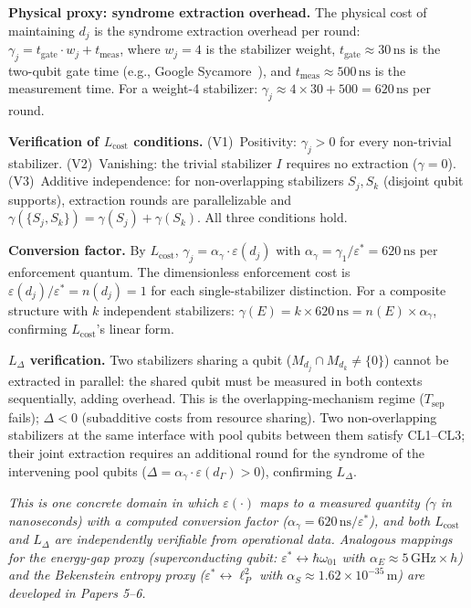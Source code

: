 \documentclass[11pt]{article}
\theoremstyle{remark}
\begin{document}
\smallskip\noindent\textbf{Physical proxy: syndrome extraction overhead.}  The physical cost of maintaining $d_j$ is the syndrome extraction overhead per round: $\gamma_j = t_{\mathrm{gate}} \cdot w_j + t_{\mathrm{meas}}$, where $w_j = 4$ is the stabilizer weight, $t_{\mathrm{gate}} \approx 30\,\mathrm{ns}$ is the two-qubit gate time (e.g., Google Sycamore~\cite{GoogleQEC2023}), and $t_{\mathrm{meas}} \approx 500\,\mathrm{ns}$ is the measurement time.  For a weight-4 stabilizer: $\gamma_j \approx 4 \times 30 + 500 = 620\,\mathrm{ns}$ per round.

\smallskip\noindent\textbf{Verification of $L_{\mathrm{cost}}$ conditions.}  (V1)~Positivity: $\gamma_j > 0$ for every non-trivial stabilizer.  (V2)~Vanishing: the trivial stabilizer $I$ requires no extraction ($\gamma = 0$).  (V3)~Additive independence: for non-overlapping stabilizers $S_j, S_k$ (disjoint qubit supports), extraction rounds are parallelizable and $\gamma(\{S_j, S_k\}) = \gamma(S_j) + \gamma(S_k)$.  All three conditions hold.

\smallskip\noindent\textbf{Conversion factor.}  By $L_{\mathrm{cost}}$, $\gamma_j = \alpha_\gamma \cdot \varepsilon(d_j)$ with $\alpha_\gamma = \gamma_1 / \varepsilon^* = 620\,\mathrm{ns}$ per enforcement quantum.  The dimensionless enforcement cost is $\varepsilon(d_j)/\varepsilon^* = n(d_j) = 1$ for each single-stabilizer distinction.  For a composite structure with $k$ independent stabilizers: $\gamma(E) = k \times 620\,\mathrm{ns} = n(E) \times \alpha_\gamma$, confirming $L_{\mathrm{cost}}$'s linear form.

\smallskip\noindent\textbf{$L_\Delta$ verification.}  Two stabilizers sharing a qubit ($M_{d_j} \cap M_{d_k} \ne \{0\}$) cannot be extracted in parallel: the shared qubit must be measured in both contexts sequentially, adding overhead.  This is the overlapping-mechanism regime ($T_{\mathrm{sep}}$ fails); $\Delta < 0$ (subadditive costs from resource sharing).  Two non-overlapping stabilizers at the same interface with pool qubits between them satisfy CL1--CL3; their joint extraction requires an additional round for the syndrome of the intervening pool qubits ($\Delta = \alpha_\gamma \cdot \varepsilon(d_\Gamma) > 0$), confirming $L_\Delta$.

\smallskip\noindent\textit{This is one concrete domain in which $\varepsilon(\cdot)$ maps to a measured quantity ($\gamma$ in nanoseconds) with a computed conversion factor ($\alpha_\gamma = 620\,\mathrm{ns}/\varepsilon^*$), and both $L_{\mathrm{cost}}$ and $L_\Delta$ are independently verifiable from operational data.  Analogous mappings for the energy-gap proxy (superconducting qubit: $\varepsilon^* \leftrightarrow \hbar\omega_{01}$ with $\alpha_E \approx 5\,\mathrm{GHz} \times h$) and the Bekenstein entropy proxy ($\varepsilon^* \leftrightarrow \ell_P^2$ with $\alpha_S \approx 1.62 \times 10^{-35}\,\mathrm{m}$) are developed in Papers 5--6.}
\end{document}
